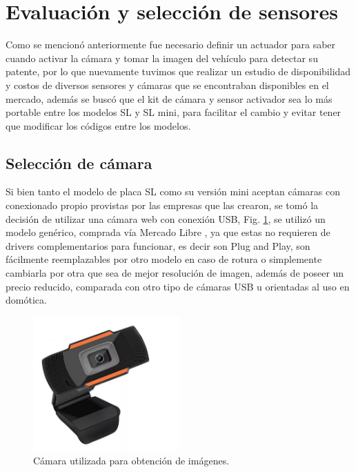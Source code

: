 \section{Evaluación y selección de sensores}
Como se mencionó anteriormente fue necesario definir un actuador para saber cuando activar la cámara y tomar la imagen del vehículo 
para detectar su patente, por lo que nuevamente tuvimos que realizar un estudio de disponibilidad y costos de diversos sensores y cámaras que se 
encontraban disponibles en el mercado, además se buscó que el kit de cámara y sensor activador sea lo más portable entre los modelos SL y SL 
mini, para facilitar el cambio y evitar tener que modificar los códigos entre los modelos.
\subsection{Selección de cámara}
Si bien tanto el modelo de placa SL como su versión mini aceptan cámaras con conexionado propio provistas por las empresas que las crearon,
se tomó la decisión de utilizar una cámara web con conexión USB, Fig. \ref{fig:camara-usb}, se utilizó un modelo genérico, comprada vía Mercado 
Libre %
, ya que estas no requieren de drivers complementarios para funcionar, es decir son Plug and Play, son fácilmente reemplazables 
por otro modelo en caso de rotura o simplemente cambiarla por otra que sea de mejor resolución de imagen, además de poseer un precio reducido, 
comparada con otro tipo de cámaras USB u orientadas al uso en domótica.
\begin{figure}
    \centering
    \includegraphics[width=0.5\textwidth]{imgs/camara-usb.jpg}
    \caption{Cámara utilizada para obtención de imágenes.}
    \label{fig:camara-usb}
\end{figure}

